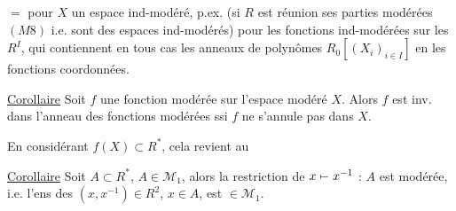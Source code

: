  $=$ pour $X$ un espace ind-modéré, p.ex. (si $R$ est réunion  ses parties modérées $(M8)$ i.e.  sont des espaces ind-modérés) pour les fonctions ind-modérées sur les $R^I$, qui contiennent en tous cas les  anneaux de polynômes $R_0[(X_i)_{i\in I}]$ en les fonctions coordonnées.


\uline{Corollaire} Soit $f$ une fonction modérée sur l'espace modéré $X$. Alors $f$ est inv. dans l'anneau des fonctions modérées ssi $f$ ne s'annule pas dans $X$.

En considérant $f(X)\subset R^*$, cela revient au

\uline{Corollaire} Soit $A\subset R^*$, $A\in\mathcal M_1$, alors la restriction de $x\mathrel{\mapstochar\relbar}x^{-1}$ : $A$ est modérée, i.e. l'ens des $(x,x^{-1})\in R^2$, $x\in A$, est $\in\mathcal M_1$.
